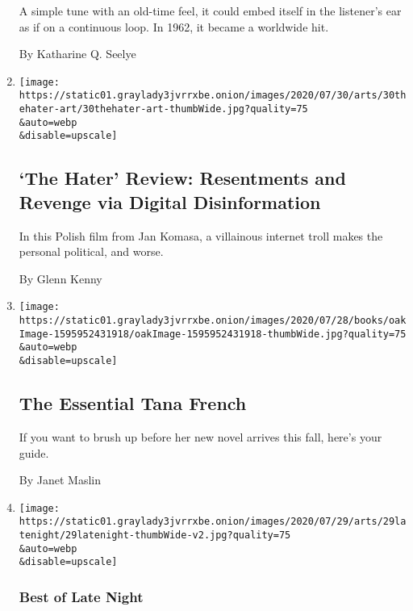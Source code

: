 \begin{enumerate}
  A simple tune with an old-time feel, it could embed itself in the
  listener's ear as if on a continuous loop. In 1962, it became a
  worldwide hit.

  By Katharine Q. Seelye
\item
  \href{/2020/07/29/movies/the-hater-review.html}{}

  \texttt{[image: https://static01.graylady3jvrrxbe.onion/images/2020/07/30/arts/30thehater-art/30thehater-art-thumbWide.jpg?quality=75\\\&auto=webp\\\&disable=upscale]}

  \hypertarget{the-hater-review-resentments-and-revenge-via-digital-disinformation}{%
  \subsection{`The Hater' Review: Resentments and Revenge via Digital
  Disinformation}\label{the-hater-review-resentments-and-revenge-via-digital-disinformation}}

  In this Polish film from Jan Komasa, a villainous internet troll makes
  the personal political, and worse.

  By Glenn Kenny
\item
  \href{/2020/07/29/books/the-essential-tana-french.html}{}

  \texttt{[image: https://static01.graylady3jvrrxbe.onion/images/2020/07/28/books/oakImage-1595952431918/oakImage-1595952431918-thumbWide.jpg?quality=75\\\&auto=webp\\\&disable=upscale]}

  \hypertarget{the-essential-tana-french}{%
  \subsection{The Essential Tana
  French}\label{the-essential-tana-french}}

  If you want to brush up before her new novel arrives this fall, here's
  your guide.

  By Janet Maslin
\item
  \href{/2020/07/29/arts/television/late-night-trump-coronavirus-hydroxychloroquine.html}{}

  \texttt{[image: https://static01.graylady3jvrrxbe.onion/images/2020/07/29/arts/29latenight/29latenight-thumbWide-v2.jpg?quality=75\\\&auto=webp\\\&disable=upscale]}

  \hypertarget{best-of-late-night}{%
  \subsubsection{Best of Late Night}\label{best-of-late-night}}


\end{enumerate}
